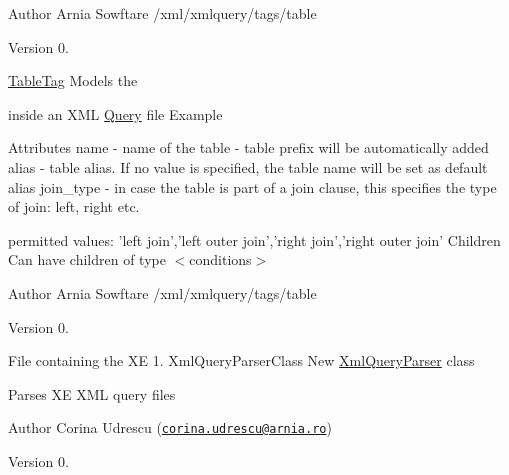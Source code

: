 \begin{DoxyAuthor}{Author}
Arnia Sowftare /xml/xmlquery/tags/table 
\end{DoxyAuthor}
\begin{DoxyVersion}{Version}
0.
\end{DoxyVersion}
\hyperlink{classTableTag}{Table\-Tag} Models the \begin{TabularC}{0}
\hline
\end{TabularC}
inside an X\-M\-L \hyperlink{classQuery}{Query} file  Example \begin{TabularC}{0}
\hline
\end{TabularC}
Attributes name -\/ name of the table -\/ table prefix will be automatically added alias -\/ table alias. If no value is specified, the table name will be set as default alias join\-\_\-type -\/ in case the table is part of a join clause, this specifies the type of join\-: left, right etc.
\begin{DoxyItemize}
\item permitted values\-: 'left join','left outer join','right join','right outer join' Children Can have children of type $<$conditions$>$
\end{DoxyItemize}

\begin{DoxyAuthor}{Author}
Arnia Sowftare /xml/xmlquery/tags/table 
\end{DoxyAuthor}
\begin{DoxyVersion}{Version}
0.
\end{DoxyVersion}
File containing the X\-E 1. Xml\-Query\-Parser\-Class New \hyperlink{classXmlQueryParser}{Xml\-Query\-Parser} class \par
 Parses X\-E X\-M\-L query files

\begin{DoxyAuthor}{Author}
Corina Udrescu (\href{mailto:corina.udrescu@arnia.ro}{\tt corina.\-udrescu@arnia.\-ro})  
\end{DoxyAuthor}
\begin{DoxyVersion}{Version}
0. 
\end{DoxyVersion}
